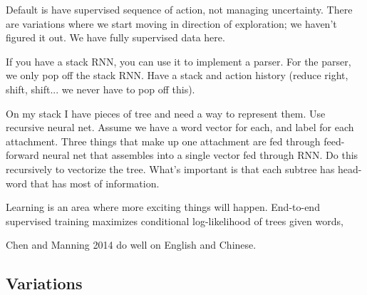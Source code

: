 Default is have supervised sequence of action, not managing uncertainty. There are variations where we start moving in direction of exploration; we haven't figured it out.
We have fully supervised data here. 


If you have a stack RNN, you can use it to implement a parser. For the parser, we only pop off the stack RNN. Have a stack and action history (reduce right, shift, shift... we never have to pop off this). 

On my stack I have pieces of tree and need a way to represent them. Use recursive neural net. Assume we have a word vector for each, and label for each attachment. Three things that make up one attachment are fed through feed-forward neural net that assembles into a single vector fed through RNN.
Do this recursively to vectorize the tree. What's important is that each subtree has head-word that has most of information.

Learning is an area where more exciting things will happen. End-to-end supervised training maximizes conditional log-likelihood of trees given words,

Chen and Manning 2014 do well on English and Chinese.

\subsection{Variations}

